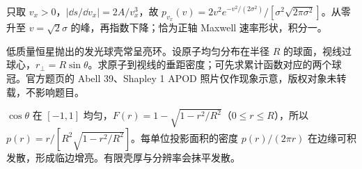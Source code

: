 \begin{solution}
只取 $v_x>0$，$|\dd s/\dd v_x|=2A/v_x^3$，故 $p_{v_x}(v)=2v^2e^{-v^2/(2\sigma^2)}/[\sigma^2\sqrt{2\pi\sigma^2}]$。从零升至 $v=\sqrt2\sigma$ 的峰，再指数下降；恰为正轴 Maxwell 速率形状，积分一。
\end{solution}
\begin{center}\end{center}
\begin{exercise}
低质量恒星抛出的发光球壳常呈亮环。设原子均匀分布在半径 $R$ 的球面，视线过球心，$r_\perp=R\sin\theta$。求原子到视线的垂距密度；可先求累计函数对应的两个球冠。官方题页的 Abell 39、Shapley 1 APOD 照片仅作现象示意，版权对象未转载，不影响题目。
\end{exercise}
\begin{solution}
$\cos\theta$ 在 $[-1,1]$ 均匀，$F(r)=1-\sqrt{1-r^2/R^2}$（$0\le r\le R$），所以 $p(r)=r/[R^2\sqrt{1-r^2/R^2}]$。每单位投影面积的密度 $p(r)/(2\pi r)$ 在边缘可积发散，形成临边增亮。有限壳厚与分辨率会抹平发散。
\end{solution}
